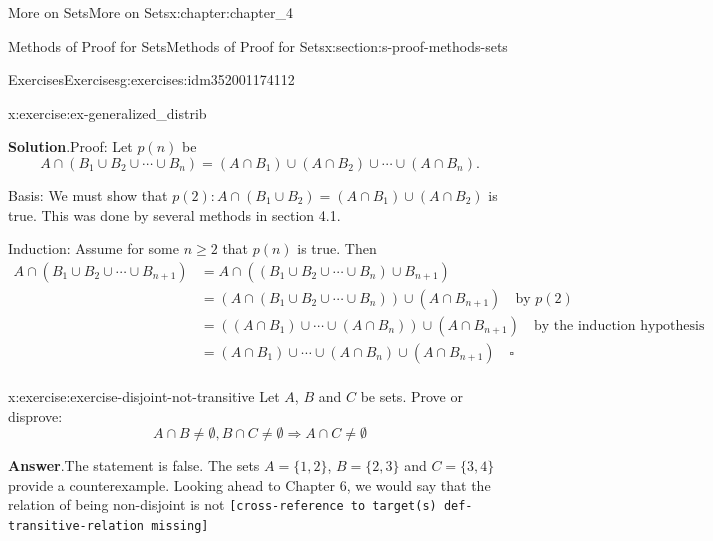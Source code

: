 \documentclass[oneside,10pt,]{book}
\newcommand{\blocktitlefont}{\relax}
\newcommand{\mono}[1]{\texttt{#1}}
\begin{document}
\begin{chapterptx}{More on Sets}{}{More on Sets}{}{}{x:chapter:chapter_4}
\begin{sectionptx}{Methods of Proof for Sets}{}{Methods of Proof for Sets}{}{}{x:section:s-proof-methods-sets}
\begin{exercises-subsection}{Exercises}{}{Exercises}{}{}{g:exercises:idm352001174112}
\begin{divisionexercise}{5}{}{}{x:exercise:ex-generalized_distrib}
\par\smallskip%
\noindent\textbf{\blocktitlefont Solution}.\hypertarget{g:solution:idm352001114128}{}\quad{}Proof: Let \(p(n)\) be%
\begin{equation*}
A\cap (B_1\cup B_2\cup \cdots \cup B_n)=(A\cap B_1)\cup (A\cap B_2)\cup \cdots \cup (A\cap B_n)\text{.}
\end{equation*}
%
\par
Basis: We must show that \(p(2) : A \cap  (B_1 \cup B_2 )=(A\cap B_1) \cup (A\cap B_2)\) is true. This was done by several methods in section 4.1.%
\par
Induction: Assume for some \(n\geq 2\) that \(p(n)\) is true. Then%
\begin{equation*}
\begin{split}
A\cap (B_1\cup B_2\cup \cdots \cup B_{n+1})&=A\cap ((B_1\cup B_2\cup \cdots \cup B_n)\cup B_{n+1})\\
&=(A \cap (B_1\cup B_2\cup \cdots \cup B_n))\cup (A\cap B_{n+1}) \quad \textrm{by } p(2)\\
&=((A\cap B_1)\cup \cdots \cup (A\cap B_n))\cup (A\cap B_{n+1})\quad \textrm{by the induction hypothesis}\\
&=(A\cap B_1)\cup \cdots \cup (A\cap B_n)\cup (A\cap B_{n+1})\quad \square\\
\end{split}
\end{equation*}
%
\end{divisionexercise}%
\begin{divisionexercise}{6}{}{}{x:exercise:exercise-disjoint-not-transitive}%
Let \(A\), \(B\) and \(C\) be sets. Prove or disprove:%
\begin{equation*}
A \cap B \neq \emptyset,  B \cap C \neq \emptyset \Rightarrow A\cap C \neq \emptyset
\end{equation*}
%
\par\smallskip%
\noindent\textbf{\blocktitlefont Answer}.\hypertarget{g:answer:idm352001104656}{}\quad{}The statement is false.  The sets \(A=\{1,2\}\), \(B=\{2,3\}\) and \(C=\{3,4\}\) provide a counterexample.  Looking ahead to Chapter 6, we would say that the relation of being non-disjoint is not \mono{[cross-reference to target(s) \textquotedbl{}def-transitive-relation\textquotedbl{} missing]}%
\end{divisionexercise}%
\end{exercises-subsection}
\end{sectionptx}
%
%
\typeout{************************************************}

\end{chapterptx}
\end{document}
